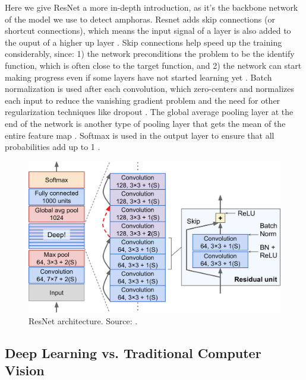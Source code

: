\documentclass[a4paper, 11pt, oneside]{article}
\begin{document}
  Here we give ResNet a more in-depth introduction, as it's the backbone network of the model we use to detect amphoras.
  Resnet adds skip connections (or shortcut connections), which means the input signal of a layer is also added to the
  ouput of a higher up layer \cite{geron2019hands, he2016deep}. Skip connections help speed up the training considerably,
  since: 1) the network preconditions the problem to be the identify function, which is often close to the target function,
  and 2) the network can start making progress even if some layers have not started learning yet
  \cite{geron2019hands, he2016deep}. Batch normalization \cite{ioffe2015batch} is used after each convolution, which
  zero-centers and normalizes each input to reduce the vanishing gradient problem \cite{hochreiter1998vanishing} and the
  need for other regularization techniques like dropout \cite{srivastava2014dropout} \cite{geron2019hands, he2016deep}.
  The global average pooling layer at the end of the network is another type of pooling layer that gets the mean of the
  entire feature map \cite{geron2019hands, he2016deep}. Softmax is used in the output layer to ensure that all
  probabilities add up to 1 \cite{geron2019hands, he2016deep}.

  \begin{figure}[ht]
    \begin{center}
      \includegraphics[width=.8\textwidth]{resnet.png}
    \end{center}
    \caption{ResNet architecture. Source: \cite{geron2019hands}.}
  \end{figure}

  \subsection{Deep Learning vs. Traditional Computer Vision}

  \label{sec:dlvscv}
\end{document}
